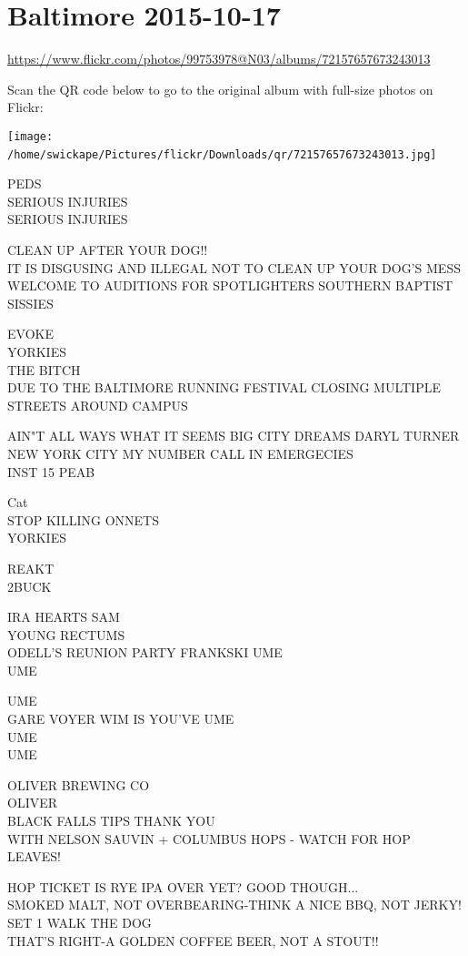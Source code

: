 \documentclass[10pt,letterpaper]{article}
\begin{document}
\section*{Baltimore 2015-10-17}

\url{https://www.flickr.com/photos/99753978@N03/albums/72157657673243013}

Scan the QR code below to go to the original album with full-size photos on Flickr:

\texttt{[image: /home/swickape/Pictures/flickr/Downloads/qr/72157657673243013.jpg]}
\

PEDS\\
SERIOUS INJURIES\\
SERIOUS INJURIES

CLEAN UP AFTER YOUR DOG!!\\
IT IS DISGUSING AND ILLEGAL NOT TO CLEAN UP YOUR DOG'S MESS\\
WELCOME TO AUDITIONS FOR SPOTLIGHTERS SOUTHERN BAPTIST SISSIES

EVOKE\\
YORKIES\\
THE BITCH\\
DUE TO THE BALTIMORE RUNNING FESTIVAL CLOSING MULTIPLE STREETS AROUND CAMPUS

AIN"T ALL WAYS WHAT IT SEEMS BIG CITY DREAMS DARYL TURNER NEW YORK CITY MY NUMBER CALL IN EMERGECIES\\
INST 15 PEAB

Cat\\
STOP KILLING ONNETS\\
YORKIES

REAKT\\
2BUCK

IRA HEARTS SAM\\
YOUNG RECTUMS\\
ODELL'S REUNION PARTY FRANKSKI UME\\
UME

UME\\
GARE VOYER WIM IS YOU'VE UME\\
UME\\
UME

OLIVER BREWING CO\\
OLIVER\\
BLACK FALLS TIPS THANK YOU\\
WITH NELSON SAUVIN + COLUMBUS HOPS {-} WATCH FOR HOP LEAVES!

HOP TICKET IS RYE IPA OVER YET?  GOOD THOUGH...\\
SMOKED MALT, NOT OVERBEARING{-}THINK A NICE BBQ, NOT JERKY!\\
SET 1 WALK THE DOG\\
THAT'S RIGHT{-}A GOLDEN COFFEE BEER, NOT A STOUT!!
\end{document}
